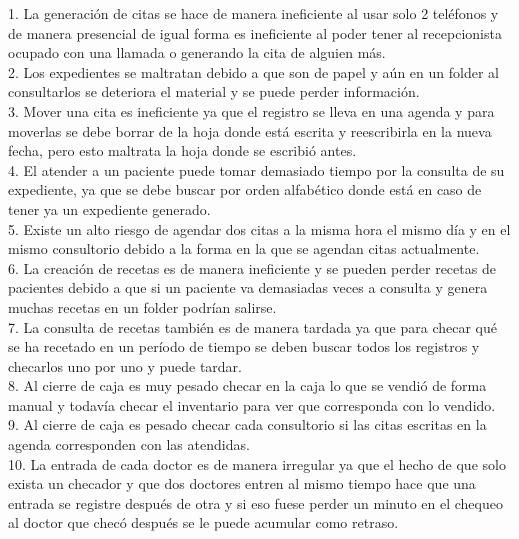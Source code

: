 1. La generación de citas se hace de manera ineficiente al usar solo 2 teléfonos y de manera presencial de igual forma es ineficiente al poder tener al recepcionista ocupado con una llamada o generando la cita de alguien más. \\

2. Los expedientes se maltratan debido a que son de papel y aún en un folder al consultarlos se deteriora el material y se puede perder información. \\

3. Mover una cita es ineficiente ya que el registro se lleva en una agenda y para moverlas se debe borrar de la hoja donde está escrita y reescribirla en la nueva fecha, pero esto maltrata la hoja donde se escribió antes. \\

4. El atender a un paciente puede tomar demasiado tiempo por la consulta de su expediente, ya que se debe buscar por orden alfabético donde está en caso de tener ya un expediente generado. \\

5. Existe un alto riesgo de agendar dos citas a la misma hora el mismo día y en el mismo consultorio debido a la forma en la que se agendan citas actualmente. \\

6. La creación de recetas es de manera ineficiente y se pueden perder recetas de pacientes debido a que si un paciente va demasiadas veces a consulta y genera muchas recetas en un folder podrían salirse. \\

7. La consulta de recetas también es de manera tardada ya que para checar qué se ha recetado en un período de tiempo se deben buscar todos los registros y checarlos uno por uno y puede tardar. \\

8. Al cierre de caja es muy pesado checar en la caja lo que se vendió de forma manual y todavía checar el inventario para ver que corresponda con lo vendido. \\

9. Al cierre de caja es pesado checar cada consultorio si las citas escritas en la agenda corresponden con las atendidas. \\

10. La entrada de cada doctor es de manera irregular ya que el hecho de que solo exista un checador y que dos doctores entren al mismo tiempo hace que una entrada se registre después de otra y si eso fuese perder un minuto en el chequeo al doctor que checó después se le puede acumular como retraso.

